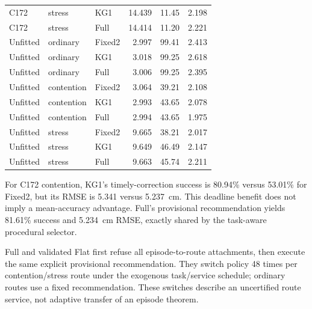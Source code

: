 \begin{table}[!htbp]
\begin{tabular}{@{}lllrrr@{}}
C172 & stress & KG1 & 14.439 & 11.45 & 2.198\\
C172 & stress & Full & 14.414 & 11.20 & 2.221\\
Unfitted & ordinary & Fixed2 & 2.997 & 99.41 & 2.413\\
Unfitted & ordinary & KG1 & 3.018 & 99.25 & 2.618\\
Unfitted & ordinary & Full & 3.006 & 99.25 & 2.395\\
Unfitted & contention & Fixed2 & 3.064 & 39.21 & 2.108\\
Unfitted & contention & KG1 & 2.993 & 43.65 & 2.078\\
Unfitted & contention & Full & 2.994 & 43.65 & 1.975\\
Unfitted & stress & Fixed2 & 9.665 & 38.21 & 2.017\\
Unfitted & stress & KG1 & 9.649 & 46.49 & 2.147\\
Unfitted & stress & Full & 9.663 & 45.74 & 2.211\\
\bottomrule\end{tabular}\end{table}
For C172 contention, KG1's timely-correction success is 80.94\% versus 53.01\% for Fixed2, but its RMSE is 5.341 versus 5.237~cm. This deadline benefit does not imply a mean-accuracy advantage. Full's provisional recommendation yields 81.61\% success and 5.234~cm RMSE, exactly shared by the task-aware procedural selector.

Full and validated Flat first refuse all episode-to-route attachments, then execute the same explicit provisional recommendation. They switch policy 48 times per contention/stress route under the exogenous task/service schedule; ordinary routes use a fixed recommendation. These switches describe an uncertified route service, not adaptive transfer of an episode theorem.

